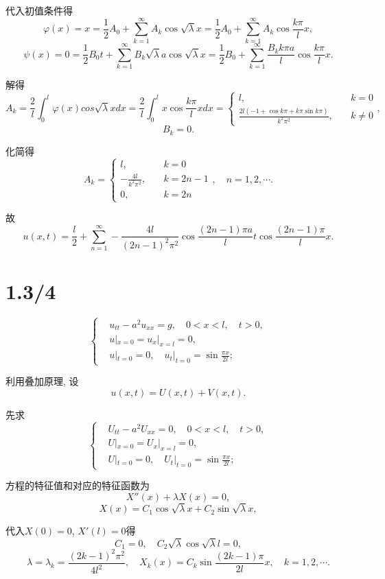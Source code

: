 \documentclass[11pt,a4paper]{article}
\begin{document}
代入初值条件得
$$\varphi(x)=x=\frac{1}{2}A_0+\sum_{k=1}^\infty A_k\cos\sqrt{\lambda}x=\frac{1}{2}A_0+\sum_{k=1}^\infty A_k\cos\frac{k\pi }{l}x,$$
$$\psi(x)=0=\frac{1}{2}B_0t+\sum_{k=1}^\infty B_k\sqrt{\lambda}a\cos\sqrt{\lambda}x=\frac{1}{2}B_0+\sum_{k=1}^\infty \frac{B_kk\pi a}{l}\cos\frac{k\pi}{l}x.$$

解得
$$A_k=\frac{2}{l}\int_0^l\varphi(x)cos\sqrt{\lambda}xdx=\frac{2}{l}\int_0^lx\cos\frac{k\pi}{l}xdx=\left\{\begin{aligned}l,&\quad k=0\\\frac{2l(-1+\cos k\pi+k\pi\sin k\pi)}{k^2\pi^2},&\quad k\neq 0\end{aligned}\right.,$$
$$B_k=0.$$

化简得
$$A_k=\left\{\begin{aligned}l,&\quad k=0\\-\frac{4l}{k^2\pi^2}, &\quad k = 2n-1 \\ 0, &\quad k=2n \end{aligned}\right.,\quad n=1,2,\cdots.$$

故
$$u(x,t)=\frac{l}{2}+\sum_{n=1}^\infty-\frac{4l}{(2n-1)^2\pi^2}\cos\frac{(2n-1)\pi a}{l}t\cos\frac{(2n-1)\pi}{l}x.$$

\section{1.3/4}

$$
  \left\{\begin{aligned}
     & u_{tt}-a^2u_{xx}=g, \quad 0<x<l,\quad t>0,        \\
     & u|_{x=0}=u_x|_{x=l}=0,                            \\
     & u|_{t=0}=0,\quad u_t|_{t=0}=\sin\frac{\pi x}{2l};
  \end{aligned}\right.
$$

利用叠加原理, 设$$u(x,t)=U(x,t)+V(x,t).$$

先求
$$
  \left\{\begin{aligned}
     & U_{tt}-a^2U_{xx}=0, \quad 0<x<l,\quad t>0,        \\
     & U|_{x=0}=U_x|_{x=l}=0,                            \\
     & U|_{t=0}=0,\quad U_t|_{t=0}=\sin\frac{\pi x}{2l};
  \end{aligned}\right.
$$

方程的特征值和对应的特征函数为
$$X''(x)+\lambda X(x)=0,$$
$$X(x)=C_1\cos\sqrt{\lambda}x+C_2\sin\sqrt{\lambda}x,$$

代入$X(0)=0$, $X'(l)=0$得
$$C_1=0,\quad C_2\sqrt{\lambda}\cos\sqrt{\lambda}l=0,$$
$$\lambda=\lambda_k=\frac{(2k-1)^2\pi^2}{4l^2},\quad X_k(x)=C_k\sin\frac{(2k-1)\pi}{2l}x,\quad k=1,2,\cdots.$$
\end{document}
